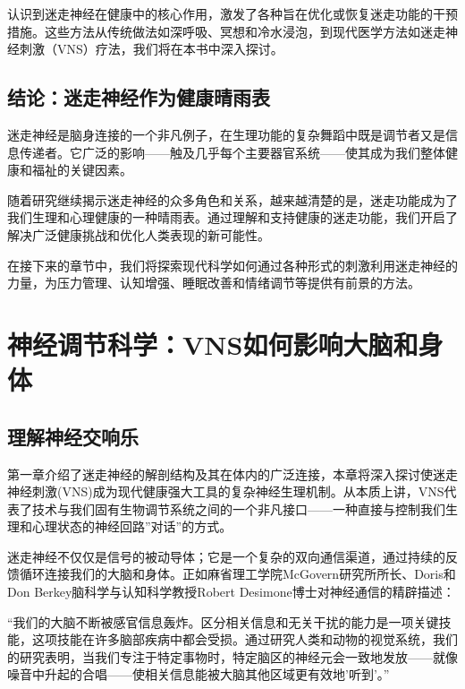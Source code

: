 \documentclass[
  Letterpaper,
]{scrbook}
\begin{document}
认识到迷走神经在健康中的核心作用，激发了各种旨在优化或恢复迷走功能的干预措施。这些方法从传统做法如深呼吸、冥想和冷水浸泡，到现代医学方法如迷走神经刺激（VNS）疗法，我们将在本书中深入探讨。

\section{结论：迷走神经作为健康晴雨表}\label{ux7ed3ux8bbaux8ff7ux8d70ux795eux7ecfux4f5cux4e3aux5065ux5eb7ux6674ux96e8ux8868}

迷走神经是脑身连接的一个非凡例子，在生理功能的复杂舞蹈中既是调节者又是信息传递者。它广泛的影响------触及几乎每个主要器官系统------使其成为我们整体健康和福祉的关键因素。

随着研究继续揭示迷走神经的众多角色和关系，越来越清楚的是，迷走功能成为了我们生理和心理健康的一种晴雨表。通过理解和支持健康的迷走功能，我们开启了解决广泛健康挑战和优化人类表现的新可能性。

在接下来的章节中，我们将探索现代科学如何通过各种形式的刺激利用迷走神经的力量，为压力管理、认知增强、睡眠改善和情绪调节等提供有前景的方法。


\chapter{神经调节科学：VNS如何影响大脑和身体}\label{ux795eux7ecfux8c03ux8282ux79d1ux5b66vnsux5982ux4f55ux5f71ux54cdux5927ux8111ux548cux8eabux4f53}

\section{理解神经交响乐}\label{ux7406ux89e3ux795eux7ecfux4ea4ux54cdux4e50}

第一章介绍了迷走神经的解剖结构及其在体内的广泛连接，本章将深入探讨使迷走神经刺激(VNS)成为现代健康强大工具的复杂神经生理机制。从本质上讲，VNS代表了技术与我们固有生物调节系统之间的一个非凡接口------一种直接与控制我们生理和心理状态的神经回路''对话''的方式。

迷走神经不仅仅是信号的被动导体；它是一个复杂的双向通信渠道，通过持续的反馈循环连接我们的大脑和身体。正如麻省理工学院McGovern研究所所长、Doris和Don
Berkey脑科学与认知科学教授Robert Desimone博士对神经通信的精辟描述：

``我们的大脑不断被感官信息轰炸。区分相关信息和无关干扰的能力是一项关键技能，这项技能在许多脑部疾病中都会受损。通过研究人类和动物的视觉系统，我们的研究表明，当我们专注于特定事物时，特定脑区的神经元会一致地发放------就像噪音中升起的合唱------使相关信息能被大脑其他区域更有效地'听到'。''
\end{document}

